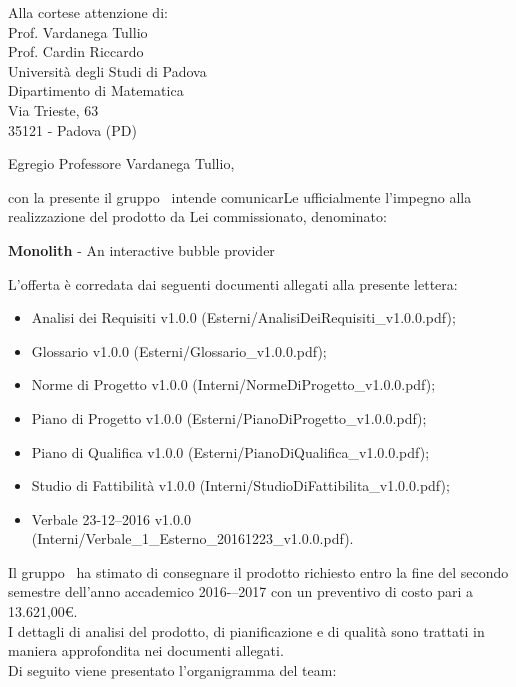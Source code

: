 

\newcommand{\logo}{../../Template/Logo/Logo.png}
\newcommand{\data}{\today}
\newcommand{\oggetto}{Presentazione della proposta per il capitolato d'appalto C5.}
\newcommand{\mittente}{Riccardo Montagnin \\ Responsabile NPE Developers}
\newcommand{\firma}{../../Template/Firme/RM.png}





\begin{letter}{Alla cortese attenzione di:  \\
 Prof. Vardanega Tullio \\
 Prof. Cardin Riccardo \\
 Università degli Studi di Padova \\
 Dipartimento di Matematica \\
 Via Trieste, 63 \\
 35121 - Padova (PD)}

\opening{Egregio Professore Vardanega Tullio,} 

con la presente il gruppo \gruppo\ intende comunicarLe ufficialmente l'impegno alla realizzazione del prodotto da Lei commissionato, denominato:
\begin{center}
\textbf{Monolith} - An interactive bubble provider
\end{center}
L'offerta è corredata dai seguenti documenti allegati alla presente lettera:
\begin{itemize}
	\item  Analisi dei Requisiti v1.0.0 (Esterni/AnalisiDeiRequisiti\_v1.0.0.pdf);
	\item  Glossario v1.0.0 (Esterni/Glossario\_v1.0.0.pdf);
	\item  Norme di Progetto v1.0.0 (Interni/NormeDiProgetto\_v1.0.0.pdf);
	\item  Piano di Progetto v1.0.0 (Esterni/PianoDiProgetto\_v1.0.0.pdf);
	\item  Piano di Qualifica v1.0.0 (Esterni/PianoDiQualifica\_v1.0.0.pdf);
	\item  Studio di Fattibilità v1.0.0 (Interni/StudioDiFattibilita\_v1.0.0.pdf);
	\item  Verbale 23-12--2016 v1.0.0 (Interni/Verbale\_1\_Esterno\_20161223\_v1.0.0.pdf).
\end{itemize}

Il gruppo \gruppo\ ha stimato di consegnare il prodotto richiesto entro la fine del secondo semestre dell'anno accademico 2016-–2017 con un preventivo di costo pari a 13.621,00\euro. \\
I dettagli di analisi del prodotto, di pianificazione e di qualità sono trattati in maniera approfondita nei documenti allegati. \\
Di seguito viene presentato l'organigramma del team:


\end{letter}
